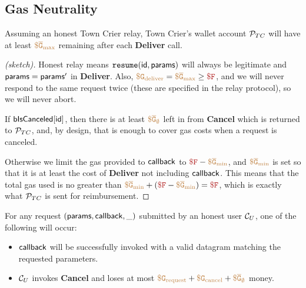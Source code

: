 \subsection{Gas Neutrality}


\begin{theorem}
Assuming an honest Town Crier relay,
Town Crier's wallet account ${\cal P}_{TC}$ will have at least $\tt {\color{brown} \$\overline{G}_\text{max} }$ remaining after each {\bf Deliver} call.
\end{theorem}

\begin{proof}[(sketch)]
Honest relay means $\texttt{resume}({\sf id}, {\sf params})$ will always be legitimate and ${\sf params} = {\sf params}'$ in {\bf Deliver}.
Also, $\gasdeliver = \constgasmax \geq \fee$, and we will never respond to the same request twice (these are specified in the relay protocol), so we will never abort.

If ${\sf bIsCanceled}[{\sf id}]$, then there is at least $\tt {\color{brown} \$\overline{G}_\emptyset }$ left in \tcont from {\bf Cancel} which is returned to ${\cal P}_{TC}$,
and, by design, that is enough to cover gas costs when a request is canceled.

Otherwise we limit the gas provided to ${\sf callback}$ to $\fee - \constgasmin$, and $\tt {\color{brown} \$\overline{G}_\text{min} }$ is set so that it is at least the cost of {\bf Deliver} not including ${\sf callback}$.
This means that the total gas used is no greater than $\constgasmin + (\fee - \constgasmin) = \fee$, which is exactly what ${\cal P}_{TC}$ is sent for reimbursement.
\end{proof}


\begin{theorem}
For any request $({\sf params}, {\sf callback}, \_)$ submitted by an honest user ${\cal C}_U$, one of the following will occur:
\begin{itemize}
  \item ${\sf callback}$ will be successfully invoked with a valid datagram matching the requested parameters.

  \item ${\cal C}_U$ invokes {\bf Cancel} and loses at most $\tt {\color{brown} \$G_\text{request} } + \tt {\color{brown} \$G_\text{cancel} } + \tt {\color{brown} \$\overline{G}_\emptyset }$ money.
\end{itemize}
\end{theorem}

